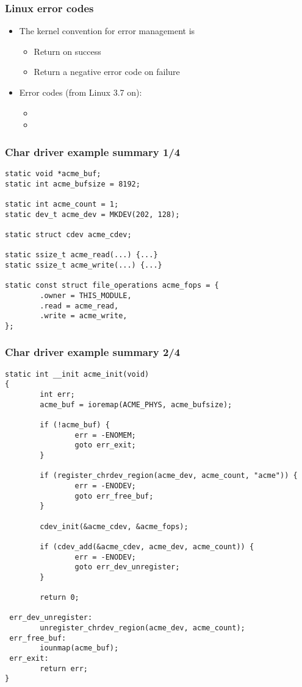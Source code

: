 \begin{frame}
  \frametitle{Linux error codes}
  \begin{itemize}
  \item The kernel convention for error management is
    \begin{itemize}
    \item Return  on success
    \item Return a negative error code on failure
    \end{itemize}
  \item Error codes (from Linux 3.7 on):
    \begin{itemize}
    \item {}
    \item {}
    \end{itemize}
  \end{itemize}
\end{frame}

\begin{frame}[fragile]
  \frametitle{Char driver example summary 1/4}
\begin{verbatim}
static void *acme_buf;
static int acme_bufsize = 8192;

static int acme_count = 1;
static dev_t acme_dev = MKDEV(202, 128);

static struct cdev acme_cdev;

static ssize_t acme_read(...) {...}
static ssize_t acme_write(...) {...}

static const struct file_operations acme_fops = {
        .owner = THIS_MODULE,
        .read = acme_read,
        .write = acme_write,
};
\end{verbatim}
\end{frame}

\begin{frame}[fragile]
  \frametitle{Char driver example summary 2/4}
\begin{verbatim}
static int __init acme_init(void)
{
        int err;
        acme_buf = ioremap(ACME_PHYS, acme_bufsize);

        if (!acme_buf) {
                err = -ENOMEM;
                goto err_exit;
        }

        if (register_chrdev_region(acme_dev, acme_count, "acme")) {
                err = -ENODEV;
                goto err_free_buf;
        }

        cdev_init(&acme_cdev, &acme_fops);

        if (cdev_add(&acme_cdev, acme_dev, acme_count)) {
                err = -ENODEV;
                goto err_dev_unregister;
        }

        return 0;

 err_dev_unregister:
        unregister_chrdev_region(acme_dev, acme_count);
 err_free_buf:
        iounmap(acme_buf);
 err_exit:
        return err;
}
\end{verbatim}
\end{frame}

